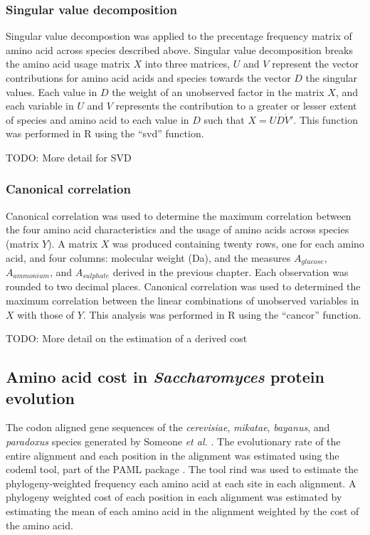 \subsubsection{Singular value decomposition}
 
Singular value decompostion was applied to the precentage frequency matrix of amino acid across species described above. Singular value decomposition breaks the amino acid usage matrix $X$ into three matrices, $U$ and $V$ represent the vector contributions for amino acid acids and species towards the vector $D$ the singular values. Each value in $D$ the weight of an unobserved factor in the matrix $X$, and each variable in $U$ and $V$  represents the contribution to a greater or lesser extent of species and amino acid to each value in $D$ such that $X = U \dot D \dot V'$. This function was performed in R using the ``svd'' function.

TODO: More detail for SVD

\subsubsection{Canonical correlation}

Canonical correlation was used to determine the maximum correlation between the four amino acid characteristics and the usage of amino acids across species (matrix $Y$). A matrix $X$ was produced containing twenty rows, one for each amino acid, and four columns: molecular weight (Da), and the measures $A_{glucose}$, $A_{ammonium}$, and $A_{sulphate}$ derived in the previous chapter. Each observation was rounded to two decimal places. Canonical correlation was used to determined the maximum correlation between the linear combinations of unobserved variables in $X$ with those of $Y$. This analysis was performed in R using the ``cancor'' function.

TODO: More detail on the estimation of a derived cost

\subsection{Amino acid cost in \emph{Saccharomyces} protein evolution}

The codon aligned gene sequences of the \emph{cerevisiae}, \emph{mikatae}, \emph{bayanus}, and \emph{paradoxus} species generated by Someone \emph{et al.} \cite{wall2005}. The evolutionary rate of the entire alignment and each position in the alignment was estimated using the codeml tool, part of the PAML package \cite{yang2007}. The tool rind \cite{bruno1996} was used to estimate the phylogeny-weighted frequency each amino acid at each site in each alignment. A phylogeny weighted cost of each position in each alignment was estimated by estimating the mean of each amino acid in the alignment weighted by the cost of the amino acid.

